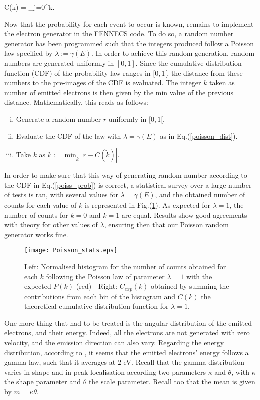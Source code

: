 \beq
C(k) = \sum_{j=0}^{\lfloor k\rfloor}. \label{poisson_dist}
\eeq


\noindent Now that the probability for each event to occur is known, remains to implement the electron generator in the FENNECS code. To do so, a random number generator has been programmed such that the integers produced follow a Poisson law specified by $\lambda := \gamma(E)$. In order to achieve this random generation, random numbers are generated uniformly in $[0,1]$. Since the cumulative distribution function (CDF) of the probability law ranges in $[0,1[$, the distance from these numbers to the pre-images of the CDF is evaluated. The integer $k$ taken as number of emitted electrons is then given by the min value of the previous distance. Mathematically, this reads as follows: 


\begin{enumerate}[i)]
\item{Generate a random number $r$ uniformly  in $[0,1[. $}
\item{Evaluate the CDF of the law with $\lambda = \gamma(E)$ as in Eq.(\ref{poisson_dist}).}
\item{Take $k$ as $k := \min_{\tilde{k}} |r-C(\tilde{k})|$}.
\end{enumerate}


\noindent In order to make sure that this way of generating random number according to the CDF in Eq.(\ref{poiss_prob}) is correct, a statistical survey over a large number of tests is ran, with several values for $\lambda = \gamma(E)$, and the obtained number of counts for each value of $k$ is represented in Fig.(\ref{Poisson_stat}). As expected for $\lambda=1$, the number of counts for $k=0$ and $k=1$ are equal. Results show good agreements with theory for other values of $\lambda$, ensuring then that our Poisson random generator works fine. \\

\begin{figure}[h!]
\centering
	\texttt{[image: Poisson\_stats.eps]}
	\caption{\label{Poisson_stat} Left: Normalised histogram for the number of counts obtained for each $k$ following the Poisson law of parameter $\lambda = 1$ with the expected $P(k)$ (red) - Right: $C_{exp}(k)$ obtained by summing the contributions from each bin of the histogram and $C(k)$ the theoretical cumulative distribution function for $\lambda = 1$. }
\end{figure}  

One more thing that had to be treated is the angular distribution of the emitted electrons, and their energy. Indeed, all the electrons are not generated with zero velocity, and the emission direction can also vary.  Regarding the energy distribution, according to \cite{HasselII, Pagonakis}, it seems that the emitted electrons' energy follows a gamma law, such that it averages at $2$ eV. Recall that the gamma distribution varies in shape and in peak localisation according two parameters $\kappa$ and $\theta$, with $\kappa$ the shape parameter and $\theta$ the scale parameter. Recall too that the mean is given by $m=\kappa \theta$. \\

